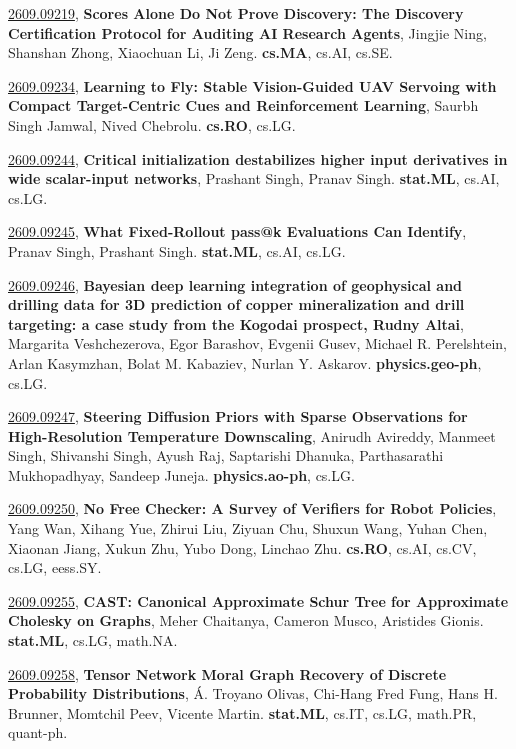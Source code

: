 \documentclass[9pt, a4paper]{article}
\theoremstyle{plain}
\theoremstyle{definition}
\theoremstyle{remark}
\newcommand{\arxivwithtarget}[3]{\hypertarget{#1}{}\href{https://arxiv.org/abs/#1}{#1}, \textbf{\textcolor{arxivblue}{#2}}, #3. }
\begin{document}
\arxivwithtarget{2609.09219}{Scores Alone Do Not Prove Discovery: The Discovery Certification Protocol for Auditing AI Research Agents}{Jingjie Ning, Shanshan Zhong, Xiaochuan Li, Ji Zeng}\textbf{cs.MA}, cs.AI, cs.SE.



\arxivwithtarget{2609.09234}{Learning to Fly: Stable Vision-Guided UAV Servoing with Compact Target-Centric Cues and Reinforcement Learning}{Saurbh Singh Jamwal, Nived Chebrolu}\textbf{cs.RO}, cs.LG.



\arxivwithtarget{2609.09244}{Critical initialization destabilizes higher input derivatives in wide scalar-input networks}{Prashant Singh, Pranav Singh}\textbf{stat.ML}, cs.AI, cs.LG.



\arxivwithtarget{2609.09245}{What Fixed-Rollout pass@k Evaluations Can Identify}{Pranav Singh, Prashant Singh}\textbf{stat.ML}, cs.AI, cs.LG.



\arxivwithtarget{2609.09246}{Bayesian deep learning integration of geophysical and drilling data for 3D prediction of copper mineralization and drill targeting: a case study from the Kogodai prospect, Rudny Altai}{Margarita Veshchezerova, Egor Barashov, Evgenii Gusev, Michael R. Perelshtein, Arlan Kasymzhan, Bolat M. Kabaziev, Nurlan Y. Askarov}\textbf{physics.geo-ph}, cs.LG.



\arxivwithtarget{2609.09247}{Steering Diffusion Priors with Sparse Observations for High-Resolution Temperature Downscaling}{Anirudh Avireddy, Manmeet Singh, Shivanshi Singh, Ayush Raj, Saptarishi Dhanuka, Parthasarathi Mukhopadhyay, Sandeep Juneja}\textbf{physics.ao-ph}, cs.LG.



\arxivwithtarget{2609.09250}{No Free Checker: A Survey of Verifiers for Robot Policies}{Yang Wan, Xihang Yue, Zhirui Liu, Ziyuan Chu, Shuxun Wang, Yuhan Chen, Xiaonan Jiang, Xukun Zhu, Yubo Dong, Linchao Zhu}\textbf{cs.RO}, cs.AI, cs.CV, cs.LG, eess.SY.



\arxivwithtarget{2609.09255}{CAST: Canonical Approximate Schur Tree for Approximate Cholesky on Graphs}{Meher Chaitanya, Cameron Musco, Aristides Gionis}\textbf{stat.ML}, cs.LG, math.NA.



\arxivwithtarget{2609.09258}{Tensor Network Moral Graph Recovery of Discrete Probability Distributions}{Á. Troyano Olivas, Chi-Hang Fred Fung, Hans H. Brunner, Momtchil Peev, Vicente Martin}\textbf{stat.ML}, cs.IT, cs.LG, math.PR, quant-ph.
\end{document}
